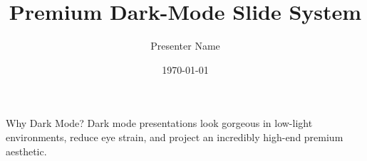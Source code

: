 \documentclass{beamer}
\title{Premium Dark-Mode Slide System}
\author{Presenter Name}
\date{\today}
\begin{document}
\maketitle

\begin{frame}{Why Dark Mode?}
  Dark mode presentations look gorgeous in low-light environments, reduce eye strain, and project an incredibly high-end premium aesthetic.
\end{frame}
\end{document}
